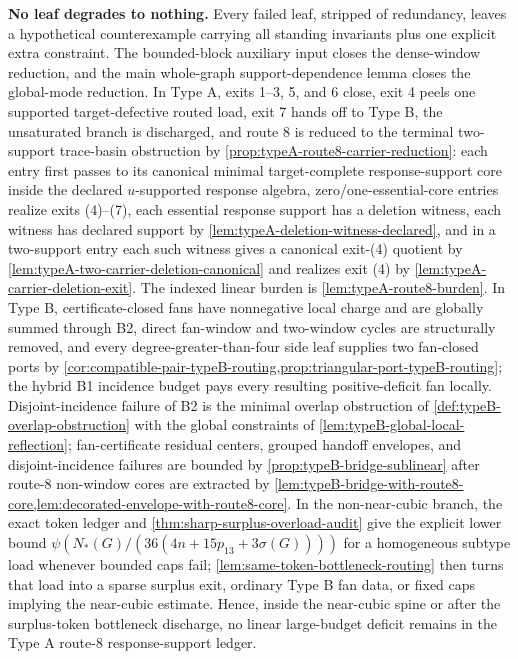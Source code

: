 \documentclass[11pt]{article}
\begin{document}
\noindent\textbf{No leaf degrades to nothing.}  Every failed leaf, stripped of redundancy, leaves a hypothetical counterexample carrying all standing invariants plus one explicit extra constraint.  The bounded-block auxiliary input closes the dense-window reduction, and the main whole-graph support-dependence lemma closes the global-mode reduction.  In Type A, exits 1--3, 5, and 6 close, exit 4 peels one supported target-defective routed load, exit 7 hands off to Type B, the unsaturated branch is discharged, and route 8 is reduced to the terminal two-support trace-basin obstruction by \cref{prop:typeA-route8-carrier-reduction}: each entry first passes to its canonical minimal target-complete response-support core inside the declared $u$-supported response algebra, zero/one-essential-core entries realize exits (4)--(7), each essential response support has a deletion witness, each witness has declared support by \cref{lem:typeA-deletion-witness-declared}, and in a two-support entry each such witness gives a canonical exit-(4) quotient by \cref{lem:typeA-two-carrier-deletion-canonical} and realizes exit (4) by \cref{lem:typeA-carrier-deletion-exit}.  The indexed linear burden is \cref{lem:typeA-route8-burden}.  In Type B, certificate-closed fans have nonnegative local charge and are globally summed through B2, direct fan-window and two-window cycles are structurally removed, and every degree-greater-than-four side leaf supplies two fan-closed ports by \cref{cor:compatible-pair-typeB-routing,prop:triangular-port-typeB-routing}; the hybrid B1 incidence budget pays every resulting positive-deficit fan locally.  Disjoint-incidence failure of B2 is the minimal overlap obstruction of \cref{def:typeB-overlap-obstruction} with the global constraints of \cref{lem:typeB-global-local-reflection}; fan-certificate residual centers, grouped handoff envelopes, and disjoint-incidence failures are bounded by \cref{prop:typeB-bridge-sublinear} after route-8 non-window cores are extracted by \cref{lem:typeB-bridge-with-route8-core,lem:decorated-envelope-with-route8-core}.  In the non-near-cubic branch, the exact token ledger and \cref{thm:sharp-surplus-overload-audit} give the explicit lower bound \(\psi(N_*(G)/(36(4n+15p_{13}+3\sigma(G))))\) for a homogeneous subtype load whenever bounded caps fail; \cref{lem:same-token-bottleneck-routing} then turns that load into a sparse surplus exit, ordinary Type B fan data, or fixed caps implying the near-cubic estimate.  Hence, inside the near-cubic spine or after the surplus-token bottleneck discharge, no linear large-budget deficit remains in the Type A route-8 response-support ledger.
\end{document}
